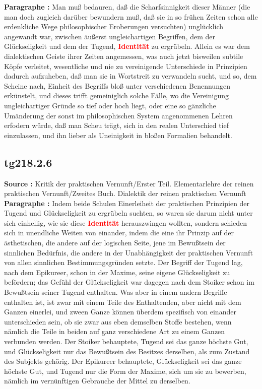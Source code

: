 \documentclass[a4paper,12pt,twoside]{book}
\newcommand{\match}[1]{\textcolor{red}{\textbf{#1}}}
\begin{document}
	\textbf{Paragraphe : }Man muß bedauren, daß die Scharfsinnigkeit dieser Männer (die man doch zugleich darüber bewundern muß, daß sie in so frühen Zeiten schon alle erdenkliche Wege philosophischer Eroberungen versuchten) unglücklich angewandt war, zwischen äußerst ungleichartigen Begriffen, dem der Glückseligkeit und dem der Tugend, \match{Identität} zu ergrübeln. Allein es war dem dialektischen Geiste ihrer Zeiten angemessen, was auch jetzt bisweilen subtile Köpfe verleitet, wesentliche und nie zu vereinigende Unterschiede in Prinzipien dadurch aufzuheben, daß man sie in Wortstreit zu verwandeln sucht, und so, dem Scheine nach, Einheit des Begriffs bloß unter verschiedenen Benennungen erkünstelt, und dieses trifft gemeiniglich solche Fälle, wo die Vereinigung ungleichartiger Gründe so tief oder hoch liegt, oder eine so gänzliche Umänderung der sonst im philosophischen System angenommenen Lehren erfodern würde, daß man Scheu trägt, sich in den realen Unterschied tief einzulassen, und ihn lieber als Uneinigkeit in bloßen Formalien behandelt. 
	
	\subsection*{tg218.2.6} 
	\textbf{Source : }Kritik der praktischen Vernunft/Erster Teil. Elementarlehre der reinen praktischen Vernunft/Zweites Buch. Dialektik der reinen praktischen Vernunft\\  
	
	\textbf{Paragraphe : }Indem beide Schulen Einerleiheit der praktischen Prinzipien der Tugend und Glückseligkeit zu ergrübeln suchten, so waren sie darum nicht unter sich einhellig, wie sie diese \match{Identität} herauszwingen wollten, sondern schieden sich in unendliche Weiten von einander, indem die eine ihr Prinzip auf der ästhetischen, die andere auf der logischen Seite, jene im Bewußtsein der sinnlichen Bedürfnis, die andere in der Unabhängigkeit der praktischen Vernunft von allen sinnlichen Bestimmungsgründen setzte. Der Begriff der Tugend lag, nach dem Epikureer, schon in der Maxime, seine eigene Glückseligkeit zu befördern; das Gefühl der Glückseligkeit war dagegen nach dem Stoiker schon im Bewußtsein seiner Tugend enthalten. Was aber in einem andern Begriffe enthalten ist, ist zwar mit einem Teile des Enthaltenden, aber nicht mit dem Ganzen einerlei, und zween Ganze können überdem spezifisch von einander unterschieden sein, ob sie zwar aus eben demselben Stoffe bestehen, wenn nämlich die Teile in beiden auf ganz verschiedene Art zu einem  Ganzen verbunden werden. Der Stoiker behauptete, Tugend sei das ganze höchste Gut, und Glückseligkeit nur das Bewußtsein des Besitzes derselben, als zum Zustand des Subjekts gehörig. Der Epikureer behauptete, Glückseligkeit sei das ganze höchste Gut, und Tugend nur die Form der Maxime, sich um sie zu bewerben, nämlich im vernünftigen Gebrauche der Mittel zu derselben. 
	
\end{document}
